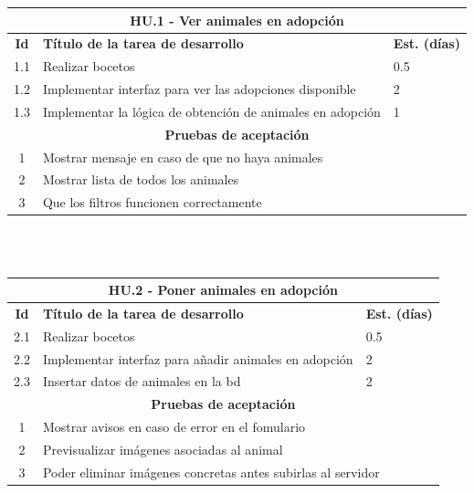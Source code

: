 \begin{tabular}{|c|p{9.5cm}|p{1cm}|}
	\hline
	\multicolumn{3}{|c|}{\textbf{HU.1 - Ver animales en adopción}} \\
	\hline
	\textbf{Id} & \textbf{Título de la tarea de desarrollo} & \textbf{Est. (días)} \\
	\hline
	1.1 & Realizar bocetos & 0.5 \\ \hline
	1.2 &  Implementar interfaz para ver las adopciones disponible & 2 \\ \hline
	1.3 &  Implementar la lógica de obtención de animales en adopción & 1 \\ \hline
	\multicolumn{3}{|c|}{\textbf{Pruebas de aceptación}} \\ \hline
	1 & \multicolumn{2}{|l|}{Mostrar mensaje en caso de que no haya animales} \\ \hline
	2 & \multicolumn{2}{|l|}{Mostrar lista de todos los animales} \\ \hline
	3 & \multicolumn{2}{|l|}{Que los filtros funcionen correctamente} \\ \hline
	
\end{tabular} \\ \\

\label{sec:hu1}

\begin{tabular}{|c|p{9.5cm}|p{1cm}|}
	\hline
	\multicolumn{3}{|c|}{\textbf{HU.2 - Poner animales en adopción}} \\
	\hline
	\textbf{Id} & \textbf{Título de la tarea de desarrollo} & \textbf{Est. (días)} \\ %
	\hline
	2.1 & Realizar bocetos & 0.5 \\ \hline
	2.2 &  Implementar interfaz para añadir animales en adopción & 2 \\ \hline
	2.3 &  Insertar datos de animales en la bd & 2 \\ \hline 
	\multicolumn{3}{|c|}{\textbf{Pruebas de aceptación}} \\ \hline
	1 & \multicolumn{2}{|l|}{Mostrar avisos en caso de error en el fomulario} \\ \hline
	2 & \multicolumn{2}{|l|}{Previsualizar imágenes asociadas al animal} \\ \hline
	3 & \multicolumn{2}{|l|}{Poder eliminar imágenes concretas antes subirlas al servidor} \\ \hline
\end{tabular} \\ \\


